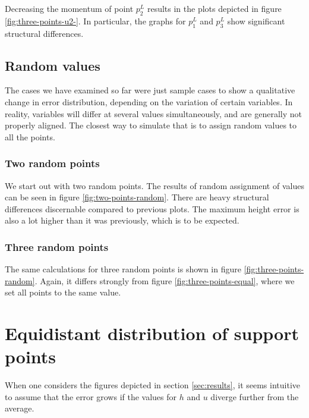 \documentclass{article}
\begin{document}
Decreasing the momentum of point $p_2^L$ results in the plots depicted in figure \ref{fig:three-points-u2-}. In particular, the graphs for $p_1^L$ and $p_3^L$ show significant structural differences.



\subsection{Random values}
\label{sec:random-values}

The cases we have examined so far were just sample cases to show a qualitative change in error distribution, depending on the variation of certain variables. In reality, variables will differ at several values simultaneously, and are generally not properly aligned. The closest way to simulate that is to assign random values to all the points.

\subsubsection{Two random points}
\label{sec:two-random-points}

We start out with two random points. The results of random assignment of values can be seen in figure \ref{fig:two-points-random}. There are heavy structural differences discernable compared to previous plots. The maximum height error is also a lot higher than it was previously, which is to be expected.



\subsubsection{Three random points}
\label{sec:three-random-points}

The same calculations for three random points is shown in figure \ref{fig:three-points-random}. Again, it differs strongly from figure \ref{fig:three-points-equal}, where we set all points to the same value.



\section{Equidistant distribution of support points}
\label{sec:equidistant-distribution-of-support-points}

When one considers the figures depicted in section \ref{sec:results}, it seems intuitive to assume that the error grows if the values for $h$ and $u$ diverge further from the average.
\end{document}
